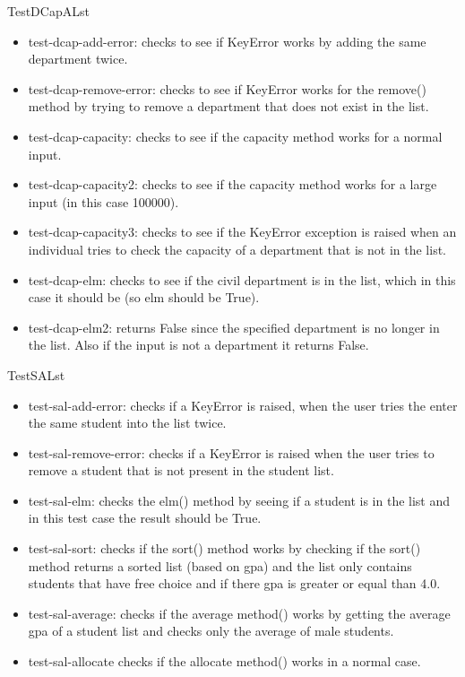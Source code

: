 \documentclass[12pt]{article}
\begin{document}
TestDCapALst
\begin{itemize}
	\item test-dcap-add-error: checks to see if KeyError works by adding the same department twice.
	\item test-dcap-remove-error: checks to see if KeyError works for the remove() method by trying to remove a department that does not exist in the list.
	\item test-dcap-capacity: checks to see if the capacity method works for a normal input.
	\item test-dcap-capacity2: checks to see if the capacity method works for a large input (in this case 100000).
	\item test-dcap-capacity3: checks to see if the KeyError exception is raised when an individual tries to check the capacity of a department that is not in the list.
	\item test-dcap-elm: checks to see if the civil department is in the list, which in this case it should be (so elm should be True).
	\item test-dcap-elm2: returns False since the specified department is no longer in the list. Also if the input is not a department it returns False.
\end{itemize}

TestSALst
\begin{itemize}
	\item test-sal-add-error: checks if a KeyError is raised, when the user tries the enter the same student into the list twice.
	\item test-sal-remove-error: checks if a KeyError is raised when the user tries to remove a student that is not present in the student list.
	\item test-sal-elm: checks the elm() method by seeing if a student is in the list and in this test case the result should be True.
	\item test-sal-sort: checks if the sort() method works by checking if the sort() method returns a sorted list (based on gpa) and the list only contains students that have free choice and if there gpa is greater or equal than 4.0.
	\item test-sal-average: checks if the average method() works by getting the average gpa of a student list and checks only the average of male students.
	\item test-sal-allocate checks if the allocate method() works in a normal case.
\end{itemize}
\end{document}
